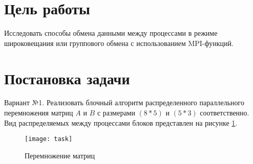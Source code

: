 \documentclass[a4paper,14pt]{extarticle}
\begin{document}


\section{Цель работы}
Исследовать способы обмена данными между процессами в режиме широковещания или
группового обмена с использованием MPI-функций.

\section{Постановка задачи}
Вариант №1. Реализовать блочный алгоритм распределенного параллельного
перемножения матриц $A$ и $B$ с размерами $(8 * 5)$ и $(5 * 3)$ соответственно.
Вид распределяемых между процессами блоков представлен на рисунке \ref{fig:task}.

\begin{figure}[H]
    \centering
    \texttt{[image: task]}
    \caption{Перемножение матриц}
    \label{fig:task}
\end{figure}
\end{document}
